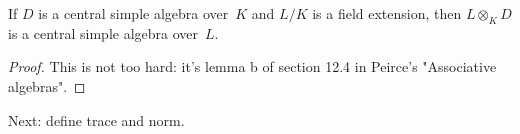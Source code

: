 \begin{lemma}
    \label{IsCentralSimple.baseChange} %
    If $D$ is a central simple algebra over~$K$ and $L/K$ is a field extension, then $L\otimes_KD$
    is a central simple algebra over~$L$.
\end{lemma}
\begin{proof}
    This is not too hard: it's lemma b of section 12.4 in Peirce's "Associative algebras".
\end{proof}


Next: define trace and norm.


